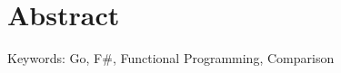 \chapter*{Abstract}
\thispagestyle{empty}


\bigskip

\noindent
Keywords: Go, F\#, Functional Programming, Comparison

